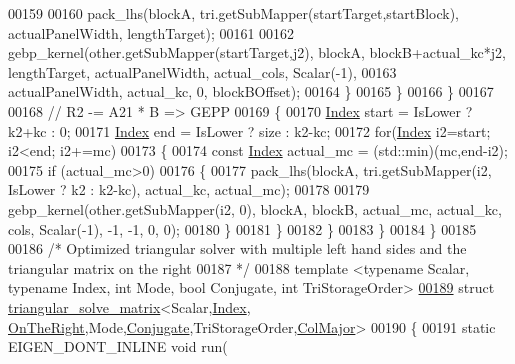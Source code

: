 \begin{DoxyCode}
00159 
00160             pack\_lhs(blockA, tri.getSubMapper(startTarget,startBlock), actualPanelWidth, lengthTarget);
00161 
00162             gebp\_kernel(other.getSubMapper(startTarget,j2), blockA, blockB+actual\_kc*j2, lengthTarget, 
      actualPanelWidth, actual\_cols, Scalar(-1),
00163                         actualPanelWidth, actual\_kc, 0, blockBOffset);
00164           \}
00165         \}
00166       \}
00167       
00168       \textcolor{comment}{// R2 -= A21 * B => GEPP}
00169       \{
00170         \hyperlink{namespace_eigen_a62e77e0933482dafde8fe197d9a2cfde}{Index} start = IsLower ? k2+kc : 0;
00171         \hyperlink{namespace_eigen_a62e77e0933482dafde8fe197d9a2cfde}{Index} end   = IsLower ? size : k2-kc;
00172         \textcolor{keywordflow}{for}(\hyperlink{namespace_eigen_a62e77e0933482dafde8fe197d9a2cfde}{Index} i2=start; i2<end; i2+=mc)
00173         \{
00174           \textcolor{keyword}{const} \hyperlink{namespace_eigen_a62e77e0933482dafde8fe197d9a2cfde}{Index} actual\_mc = (std::min)(mc,end-i2);
00175           \textcolor{keywordflow}{if} (actual\_mc>0)
00176           \{
00177             pack\_lhs(blockA, tri.getSubMapper(i2, IsLower ? k2 : k2-kc), actual\_kc, actual\_mc);
00178 
00179             gebp\_kernel(other.getSubMapper(i2, 0), blockA, blockB, actual\_mc, actual\_kc, cols, Scalar(-1), 
      -1, -1, 0, 0);
00180           \}
00181         \}
00182       \}
00183     \}
00184   \}
00185 
00186 \textcolor{comment}{/* Optimized triangular solver with multiple left hand sides and the triangular matrix on the right}
00187 \textcolor{comment}{ */}
00188 \textcolor{keyword}{template} <\textcolor{keyword}{typename} Scalar, \textcolor{keyword}{typename} Index, \textcolor{keywordtype}{int} Mode, \textcolor{keywordtype}{bool} Conjugate, \textcolor{keywordtype}{int} TriStorageOrder>
\hyperlink{struct_eigen_1_1internal_1_1triangular__solve__matrix_3_01_scalar_00_01_index_00_01_on_the_rightf2d31df4e035b9aff2381cc0bac19b97}{00189} \textcolor{keyword}{struct }\hyperlink{struct_eigen_1_1internal_1_1triangular__solve__matrix}{triangular\_solve\_matrix}<Scalar,\hyperlink{namespace_eigen_a62e77e0933482dafde8fe197d9a2cfde}{Index},
      \hyperlink{group__enums_ggac22de43beeac7a78b384f99bed5cee0ba99dc75d8e00b6c3a5bdc31940f47492b}{OnTheRight},Mode,\hyperlink{class_eigen_1_1_conjugate}{Conjugate},TriStorageOrder,\hyperlink{group__enums_ggaacded1a18ae58b0f554751f6cdf9eb13a0cbd4bdd0abcfc0224c5fcb5e4f6669a}{ColMajor}>
00190 \{
00191   \textcolor{keyword}{static} EIGEN\_DONT\_INLINE \textcolor{keywordtype}{void} run(

\end{DoxyCode}
